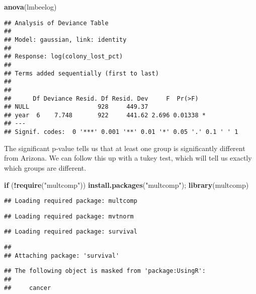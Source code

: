 \documentclass[
]{article}
\newenvironment{Shaded}{\begin{snugshade}}{\end{snugshade}}
\newcommand{\ControlFlowTok}[1]{\textcolor[rgb]{0.13,0.29,0.53}{\textbf{#1}}}
\newcommand{\FunctionTok}[1]{\textcolor[rgb]{0.13,0.29,0.53}{\textbf{#1}}}
\newcommand{\NormalTok}[1]{#1}
\newcommand{\SpecialCharTok}[1]{\textcolor[rgb]{0.81,0.36,0.00}{\textbf{#1}}}
\newcommand{\StringTok}[1]{\textcolor[rgb]{0.31,0.60,0.02}{#1}}
\begin{document}
\begin{Shaded}
\begin{Highlighting}[]
\FunctionTok{anova}\NormalTok{(lmbeelog)}
\end{Highlighting}
\end{Shaded}

\begin{verbatim}
## Analysis of Deviance Table
## 
## Model: gaussian, link: identity
## 
## Response: log(colony_lost_pct)
## 
## Terms added sequentially (first to last)
## 
## 
##      Df Deviance Resid. Df Resid. Dev     F  Pr(>F)  
## NULL                   928     449.37                
## year  6    7.748       922     441.62 2.696 0.01338 *
## ---
## Signif. codes:  0 '***' 0.001 '**' 0.01 '*' 0.05 '.' 0.1 ' ' 1
\end{verbatim}

The significant p-value tells us that at least one group is
significantly different from Arizona. We can follow this up with a tukey
test, which will tell us exactly which groups are different.

\begin{Shaded}
\begin{Highlighting}[]
\ControlFlowTok{if}\NormalTok{ (}\SpecialCharTok{!}\FunctionTok{require}\NormalTok{(}\StringTok{"multcomp"}\NormalTok{)) }\FunctionTok{install.packages}\NormalTok{(}\StringTok{"multcomp"}\NormalTok{); }\FunctionTok{library}\NormalTok{(multcomp)}
\end{Highlighting}
\end{Shaded}

\begin{verbatim}
## Loading required package: multcomp
\end{verbatim}

\begin{verbatim}
## Loading required package: mvtnorm
\end{verbatim}

\begin{verbatim}
## Loading required package: survival
\end{verbatim}

\begin{verbatim}
## 
## Attaching package: 'survival'
\end{verbatim}

\begin{verbatim}
## The following object is masked from 'package:UsingR':
## 
##     cancer
\end{verbatim}
\end{document}
